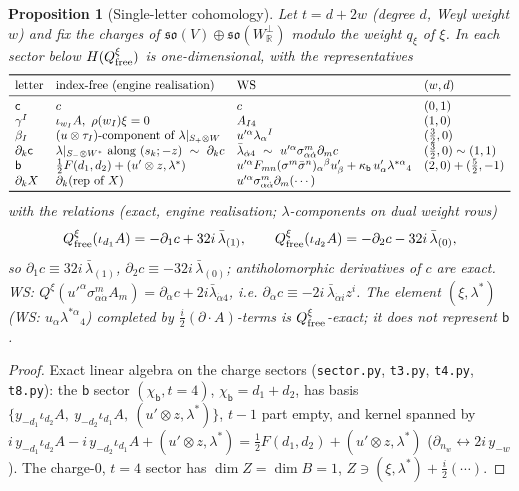 \documentclass[11pt]{article}
\newtheorem{proposition}[theorem]{Proposition}
\theoremstyle{definition}
\newcommand{\Qx}{Q^{\xi}}
\newcommand{\WS}{\textup{WS}}
\begin{document}
\begin{proposition}[Single-letter cohomology]\label{prop:letters}
Let $t=d+2w$ (degree $d$, Weyl weight $w$) and fix the charges of $\mathfrak{so}(V)\oplus\mathfrak{so}(W_{\mathbb R}^\perp)$ modulo the weight $q_\xi$ of $\xi$. In each sector below $H(\Qx_{\rm free})$ is one-dimensional, with the representatives
\[
\begin{array}{llll}
\toprule
\text{letter}&\text{index-free (engine realisation)}&\text{\WS}&(w,d)\\\midrule
\mathsf c&c&c&(0,1)\\
\gamma^I&\iota_{w_I}A,\ \rho(w_I)\xi=0&A_{I4}&(1,0)\\
\beta_I&(u\otimes\tau_I)\text{-component of }\lambda|_{S_+\otimes W}&u'^\alpha\lambda_\alpha{}^I&(\tfrac32,0)\\
\partial_k\mathsf c&\lambda|_{S_-\otimes W^*}\text{ along }(s_k;-z)\ \sim\ \partial_kc&\bar\lambda_{\dot\alpha4}\ \sim\ u'^\alpha\sigma^m_{\alpha\dot\alpha}\partial_mc&(\tfrac32,0)\sim(1,1)\\
\mathsf b&\tfrac12F(d_1,d_2)+(u'\otimes z,\lambda^*)&u'^\alpha F_{mn}(\sigma^m\bar\sigma^n)_\alpha{}^\beta u'_\beta+\kappa_{\mathsf b}\,u'_\alpha\lambda^{*\alpha}{}_4&(2,0)+(\tfrac52,-1)\\
\partial_k X&\partial_k(\text{rep of }X)&u'^\alpha\sigma^m_{\alpha\dot\alpha}\partial_m(\cdots)&\\\bottomrule
\end{array}
\]
with the relations (exact, engine realisation; $\lambda$-components on dual weight rows)
\[
\Qx_{\rm free}(\iota_{d_1}A)=-\partial_1c+32i\,\bar\lambda_{(1)},\qquad \Qx_{\rm free}(\iota_{d_2}A)=-\partial_2c-32i\,\bar\lambda_{(0)},
\]
so $\partial_1c\equiv32i\,\bar\lambda_{(1)}$, $\partial_2c\equiv-32i\,\bar\lambda_{(0)}$; antiholomorphic derivatives of $c$ are exact. \WS: $\Qx(u'^\alpha\sigma^m_{\alpha\dot\alpha}A_m)=\partial_{\dot\alpha}c+2i\bar\lambda_{\dot\alpha4}$, i.e. $\partial_{\dot\alpha}c\equiv-2i\,\bar\lambda_{\dot\alpha i}z^i$.
The element $(\xi,\lambda^*)$ (\WS: $u_\alpha\lambda^{*\alpha}{}_4$) completed by $\tfrac i2(\partial\cdot A)$-terms is $\Qx_{\rm free}$-exact; it does not represent $\mathsf b$.
\end{proposition}
\begin{proof}
Exact linear algebra on the charge sectors (\texttt{sector.py}, \texttt{t3.py}, \texttt{t4.py}, \texttt{t8.py}): the $\mathsf b$ sector $(\chi_{\mathsf b},t=4)$, $\chi_{\mathsf b}=d_1+d_2$, has basis $\{y_{-d_1}\iota_{d_2}A,\ y_{-d_2}\iota_{d_1}A,\ (u'\otimes z,\lambda^*)\}$, $t-1$ part empty, and kernel spanned by $i\,y_{-d_1}\iota_{d_2}A-i\,y_{-d_2}\iota_{d_1}A+(u'\otimes z,\lambda^*)=\tfrac12F(d_1,d_2)+(u'\otimes z,\lambda^*)$ ($\partial_{n_w}\leftrightarrow2i\,y_{-w}$). The charge-$0$, $t=4$ sector has $\dim Z=\dim B=1$, $Z\ni(\xi,\lambda^*)+\tfrac i2(\cdots)$.
\end{proof}
\end{document}
